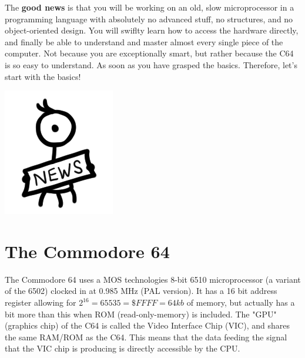 \begin{minipage}{0.8\textwidth}
The \textbf{good news} is that you will be working on an old, slow microprocessor in a programming language with absolutely no advanced stuff, no structures, and no object-oriented design. You will swiflty learn how to access the hardware directly, and finally be able to understand and master almost every single piece of the computer. Not because you are exceptionally smart, but rather because the C64 is so easy to understand. As soon as you have grasped the basics. Therefore, let's start with the basics!
\end{minipage}
\begin{minipage}{0.2\textwidth}
\includegraphics[width=\linewidth]{images/trip/trip11.png}
\end{minipage}

\section{The Commodore 64}
The Commodore 64 uses a MOS technologies 8-bit 6510 microprocessor (a variant of the 6502) clocked in at 0.985 MHz (PAL version). It has a 16 bit address register allowing for $2^16 = 65535 = \$FFFF = 64kb$ of memory, but actually has a bit more than this when ROM (read-only-memory) is included. The "GPU" (graphics chip) of the C64 is called the Video Interface Chip (VIC), and shares the same RAM/ROM as the C64. This means that the data feeding the signal that the VIC chip is producing is directly accessible by the CPU.

